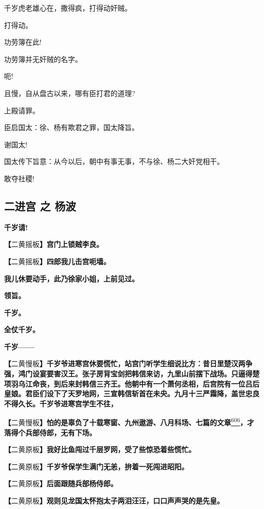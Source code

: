 千岁虎老雄心在，撒得疯，打得动奸贼。

打得动。

功劳簿在此!

功劳簿并无奸贼的名字。

呃!

且慢，自从盘古以来，哪有臣打君的道理?

上殿请罪。

臣启国太：徐、杨有欺君之罪，国太降旨。

谢国太!

国太传下旨意：从今以后，朝中有事无事，不与徐、杨二大奸党相干。

敢夺社稷!

\newpage
\hypertarget{ux4e8cux8fdbux5bab-ux4e4b-ux6768ux6ce2}{%
\subsection{二进宫 之
杨波}\label{ux4e8cux8fdbux5bab-ux4e4b-ux6768ux6ce2}}

\textbf{千岁请!}

\textbf{【}二黄摇板\textbf{】宫门上锁贼李良。}

\textbf{【}二黄摇板\textbf{】四郎我儿击宫呃墙。}

\textbf{我儿休要动手，此乃徐家小姐，上前见过。}

\textbf{领旨。}

\textbf{千岁。}

\textbf{全仗千岁。}

\textbf{千岁------}

\textbf{【}二黄慢板\textbf{】千岁爷进寒宫休要慌忙，站宫门听学生细说比方：昔日里楚汉两争强，鸿门设宴要害汉王。张子房背宝剑把韩信来访，九里山前摆下战场。只逼得楚项羽乌江命丧，到后来封韩信三齐王。他朝中有一个萧何丞相，后宫院有一位吕后皇娘。君臣们设下了天罗地网，三宣韩信斩首在未央。九月十三严霜降，盖世忠良不得久长。千岁爷进寒宫学生不往，}

\textbf{【}二黄慢板\textbf{】怕的是辜负了十载寒窗、九州遨游、八月科场、七篇的文章}\protect\hyperlink{fn606}{\textsuperscript{606}}\textbf{，才落得个兵部侍郎，无有下场。}

\textbf{【}二黄原板\textbf{】我好比鱼闯过千层罗网，受了些惊恐着些慌忙。}

\textbf{【}二黄原板\textbf{】千岁爷保学生满门无恙，拚着一死闯进昭阳。}

\textbf{【}二黄原板\textbf{】后面跟随兵部杨侍郎。}

\textbf{【}二黄原板\textbf{】观则见龙国太怀抱太子两泪汪汪，口口声声哭的是先皇。}

